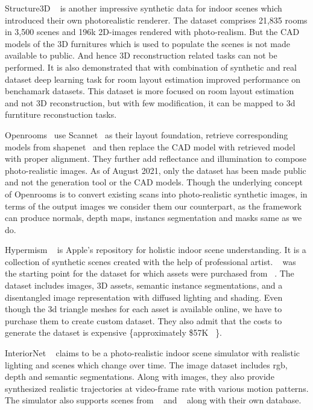 Structure3D ~\cite{zheng2020structured3d} is another impressive synthetic data for indoor scenes which introduced their own photorealistic renderer.
The dataset comprises 21,835 rooms in 3,500 scenes and 196k 2D-images rendered with photo-realism.
But the CAD models of the 3D furnitures which is used to populate the scenes is not made available to public.
And hence 3D reconstruction related tasks can not be performed.
It is also demonstrated that with combination of synthetic and real dataset deep learning task for room layout estimation improved performance on benchamark datasets.
This dataset is more focused on room layout estimation and not 3D reconstruction, but with few modification, it can be mapped to 3d furntiture reconstuction tasks.

Openrooms~\cite{li2021openrooms} use Scannet~\cite{dai2017scannet} as their layout foundation, retrieve corresponding models from shapenet~\cite{chang2015shapenet}
and then replace the CAD model with retrieved model with proper alignment.
They further add reflectance and illumination to compose photo-realistic images.
As of August 2021, only the dataset has been made public and not the generation tool or the CAD models.
Though the underlying concept of Openrooms is to convert existing scans into photo-realistic synthetic images, in terms of the output images we consider them our counterpart, as the framework can produce normals, depth maps, instancs segmentation and masks same as we do.

Hypermism ~\cite{Roberts2020HypersimAP} is Apple's repository for holistic indoor scene understanding.
It is a collection of synthetic scenes created with the help of professional artist.
~\cite{Evermotion} was the starting point for the dataset for which assets were purchased from ~\cite{TurboSquid}.
The dataset includes images, 3D assets, semantic instance segmentations, and a disentangled image representation with diffused lighting and shading.
Even though the 3d triangle meshes for each asset is available online, we have to purchase them to create custom dataset.
They also admit that the costs to generate the dataset is expensive \{approximately \$57K ~\cite{Roberts2020HypersimAP}\}.

InteriorNet ~\cite{InteriorNet18} claims to be a photo-realistic indoor scene simulator with realistic lighting and scenes which change over time.
The image dataset includes rgb, depth and semantic segmentations.
Along with images, they also provide synthesized realistic trajectories at video-frame rate with various motion patterns.
The simulator also supports scenes from ~\cite{McCormac:etal:ICCV2017} and ~\cite{Song2017SemanticSC} along with their own database.

